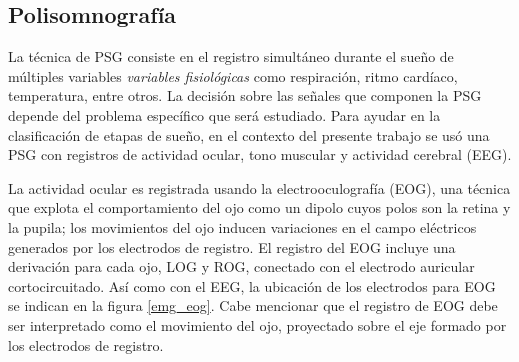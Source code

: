 \documentclass[12pt,letterpaper]{book}
\begin{document}

\subsection{Polisomnografía}
\label{sec:emg_eog}

La técnica de PSG consiste en el registro simultáneo durante el sueño de múltiples variables \textit{variables fisiológicas} como respiración, ritmo cardíaco, temperatura, entre otros.
%
La decisión sobre las señales que componen la PSG depende del problema específico que será estudiado.
%
%
Para ayudar en la clasificación de etapas de sueño, en el contexto del presente trabajo se usó una PSG con registros de actividad ocular, tono muscular y actividad cerebral (EEG).


La actividad ocular es registrada usando la electrooculografía (EOG), una técnica que explota el comportamiento del ojo como un dipolo cuyos polos son la retina y la pupila; los movimientos del ojo inducen variaciones en el campo eléctricos generados por los electrodos de registro.
%
El registro del EOG incluye una derivación para cada ojo, LOG y ROG, conectado con el electrodo auricular cortocircuitado.
%
Así como con el EEG, la ubicación de los electrodos para EOG se indican en la figura \ref{emg_eog}.
%
%
Cabe mencionar que el registro de EOG debe ser interpretado como el movimiento del ojo, proyectado sobre el eje formado por los electrodos de registro.
\end{document}
